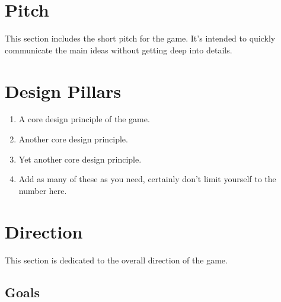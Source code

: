 

\newcommand{\gddTitle}{Game Name}
\newcommand{\gddSubtitle}{Game Subtitle}
\newcommand{\gddCompany}{Company Name}
\newcommand{\gddAuthors}{Firstname Lastname, Firstname Lastname, Firstname Lastname}
\newcommand{\gddDate}{January 1st, 1960}
\newcommand{\gddVersion}{1.0.0}

\newcommand{\gddChangelogEntries}{
\gddChangelogEntry{0.1.0}{January 1st, 1960}{
Changelog List\begin{itemize}
\item Point A
\item Point B
\item Point C
\end{itemize}}
\gddChangelogEntry{0.0.1}{January 1st, 1960}{Changelog Modified}
\gddChangelogEntry{0.0.0}{January 1st, 1960}{Changelog Created}
}



\gddTitlesection

\section{Pitch}

This section includes the short pitch for the game. It's intended to quickly communicate the main ideas without getting deep into details.

\section{Design Pillars}

\begin{enumerate}
	\item A core design principle of the game.
	\item Another core design principle.
	\item Yet another core design principle.
	\item Add as many of these as you need, certainly don't limit yourself to the number here.
\end{enumerate}

\section{Direction}

This section is dedicated to the overall direction of the game.

\subsection{Goals}

